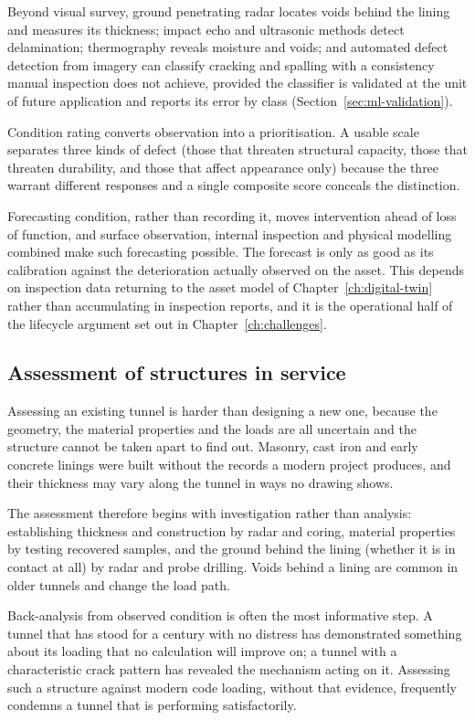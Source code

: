 Beyond visual survey, ground penetrating radar locates voids behind the lining
and measures its thickness; impact echo and ultrasonic methods detect
delamination; thermography reveals moisture and voids; and automated defect
detection from imagery can classify cracking and spalling with a consistency
manual inspection does not achieve, provided the classifier is validated at
the unit of future application and reports its error by class
(Section~\ref{sec:ml-validation}).

Condition rating converts observation into a prioritisation. A usable scale
separates three kinds of defect (those that threaten structural capacity,
those that threaten durability, and those that affect appearance only)
because the three warrant different responses and a single composite
score conceals the distinction.

Forecasting condition, rather than recording it, moves intervention ahead of
loss of function, and surface observation, internal inspection and physical
modelling combined make such forecasting possible. The forecast is only as
good as its calibration against the deterioration actually observed on the
asset.
This depends on inspection data returning to the asset model of
Chapter~\ref{ch:digital-twin} rather than accumulating in inspection reports,
and it is the operational half of the lifecycle argument set out in
Chapter~\ref{ch:challenges}.

\subsection{Assessment of structures in service}
\label{sec:assessment-in-service}

Assessing an existing tunnel is harder than designing a new one, because the
geometry, the material properties and the loads are all uncertain and the
structure cannot be taken apart to find out. Masonry, cast iron and early
concrete linings were built without the records a modern project produces, and
their thickness may vary along the tunnel in ways no drawing shows.

The assessment therefore begins with investigation rather than analysis:
establishing thickness and construction by radar and coring, material
properties by testing recovered samples, and the ground behind the lining
(whether it is in contact at all) by radar and probe drilling. Voids behind
a lining are common in older tunnels and change the load path.

Back-analysis from observed condition is often the most informative step. A
tunnel that has stood for a century with no distress has demonstrated
something about its loading that no calculation will improve on; a tunnel with
a characteristic crack pattern has revealed the mechanism acting on it.
Assessing such a structure against modern code loading, without that evidence,
frequently condemns a tunnel that is performing satisfactorily.

